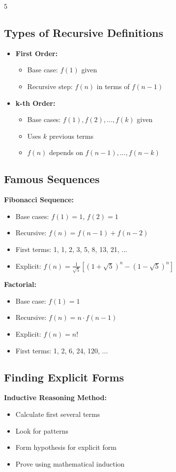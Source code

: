 \documentclass[a4paper,landscape]{article}
\begin{document}
\begin{multicols*}{5}
\subsection*{Types of Recursive Definitions}
\begin{itemize}[leftmargin=*, itemsep=0pt]
    \item \textbf{First Order:}
    \begin{itemize}[leftmargin=*, itemsep=0pt]
        \item Base case: $f(1)$ given
        \item Recursive step: $f(n)$ in terms of $f(n-1)$
    \end{itemize}
    \item \textbf{k-th Order:}
    \begin{itemize}[leftmargin=*, itemsep=0pt]
        \item Base cases: $f(1), f(2), ..., f(k)$ given
        \item Uses $k$ previous terms
        \item $f(n)$ depends on $f(n-1), ..., f(n-k)$
    \end{itemize}
\end{itemize}

\subsection*{Famous Sequences}
\textbf{Fibonacci Sequence:}
\begin{itemize}[leftmargin=*, itemsep=0pt]
    \item Base cases: $f(1)=1$, $f(2)=1$
    \item Recursive: $f(n) = f(n-1) + f(n-2)$
    \item First terms: 1, 1, 2, 3, 5, 8, 13, 21, ...
    \item Explicit: $f(n) = \frac{1}{\sqrt{5}}[(1+\sqrt{5})^n - (1-\sqrt{5})^n]$
\end{itemize}

\textbf{Factorial:}
\begin{itemize}[leftmargin=*, itemsep=0pt]
    \item Base case: $f(1)=1$
    \item Recursive: $f(n) = n \cdot f(n-1)$
    \item Explicit: $f(n) = n!$
    \item First terms: 1, 2, 6, 24, 120, ...
\end{itemize}

\subsection*{Finding Explicit Forms}
\textbf{Inductive Reasoning Method:}
\begin{itemize}[leftmargin=*, itemsep=0pt]
    \item Calculate first several terms
    \item Look for patterns
    \item Form hypothesis for explicit form
    \item Prove using mathematical induction
\end{itemize}


\end{multicols*}
\end{document}
